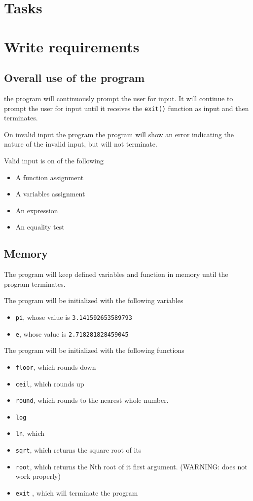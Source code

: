 \documentclass[11pt,a4paper]{article}
\begin{document}
\appendix
\section{Tasks}
\section{Write requirements}
\subsection{Overall use of the program}
the program will continuously prompt the user for input. It will
continue to prompt the user for input until it receives the
\texttt{exit()} function as input and then terminates.

On invalid input the program the program will show an error
indicating the nature of the invalid input, but will not terminate.

Valid input is on of the following
\begin{itemize}
\item A function assignment
\item A variables assignment
\item An expression
\item An equality test
\end{itemize}
\subsection{Memory}
The program will keep defined variables and function in memory
until the program terminates.


The program will be initialized with the following variables
\begin{itemize}
\item \texttt{pi}, whose value is \texttt{3.141592653589793}
\item \texttt{e}, whose value is \texttt{2.718281828459045}
\end{itemize}

The program will be initialized with the following functions
\begin{itemize}
\item \texttt{floor}, which rounds down
\item \texttt{ceil}, which rounds up
\item \texttt{round}, which rounds to the nearest  whole number.
\item \texttt{log}
\item \texttt{ln}, which
\item \texttt{sqrt}, which returns the square root of its
\item \texttt{root}, which returns the Nth root of it first argument.  (WARNING: does not work properly)
\item \texttt{exit} , which will terminate the program
\end{itemize}
\end{document}
